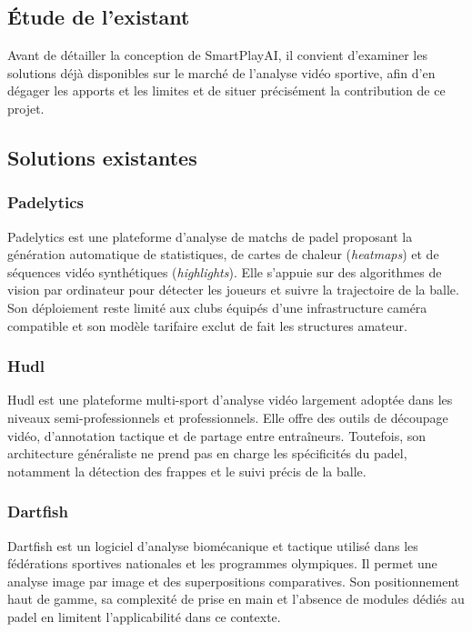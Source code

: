 \begin{itemize}
\section{Étude de l'existant}

Avant de détailler la conception de SmartPlayAI, il convient d’examiner les solutions déjà disponibles sur le marché de l’analyse vidéo sportive, afin d’en dégager les apports et les limites et de situer précisément la contribution de ce projet.

\subsection{Solutions existantes}

\subsubsection{Padelytics}
Padelytics est une plateforme d'analyse de matchs de padel proposant la génération automatique de statistiques, de cartes de chaleur (\textit{heatmaps}) et de séquences vidéo synthétiques (\textit{highlights}). Elle s'appuie sur des algorithmes de vision par ordinateur pour détecter les joueurs et suivre la trajectoire de la balle. Son déploiement reste limité aux clubs équipés d'une infrastructure caméra compatible et son modèle tarifaire exclut de fait les structures amateur.

\subsubsection{Hudl}
Hudl est une plateforme multi-sport d'analyse vidéo largement adoptée dans les niveaux semi-professionnels et professionnels. Elle offre des outils de découpage vidéo, d'annotation tactique et de partage entre entraîneurs. Toutefois, son architecture généraliste ne prend pas en charge les spécificités du padel, notamment la détection des frappes et le suivi précis de la balle.

\subsubsection{Dartfish}
Dartfish est un logiciel d'analyse biomécanique et tactique utilisé dans les fédérations sportives nationales et les programmes olympiques. Il permet une analyse image par image et des superpositions comparatives. Son positionnement haut de gamme, sa complexité de prise en main et l'absence de modules dédiés au padel en limitent l'applicabilité dans ce contexte.


\end{itemize}
